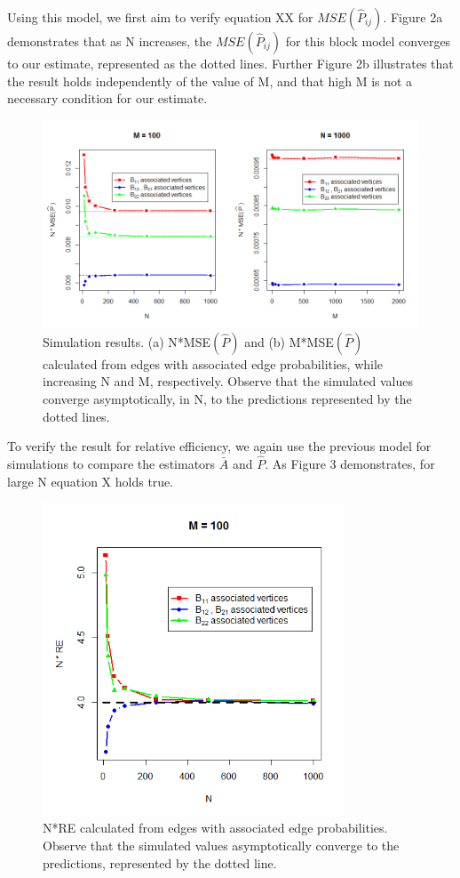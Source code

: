 Using this model, we first aim to verify equation XX for $MSE(\hat{P}_{ij})$.  Figure 2a demonstrates that as N increases, the $MSE(\hat{P}_{ij})$ for this block model converges to our estimate, represented as the dotted lines.  Further Figure 2b illustrates that the result holds independently of the value of M, and that high M is not a necessary condition for our estimate.
\begin{figure}[!htb]
	\centering
	\includegraphics[width=16cm]{MSE.PNG}
	\caption{Simulation results. (a) N*MSE$(\hat{P})$ and  (b) M*MSE$(\hat{P})$  calculated from edges with associated edge probabilities, while increasing N and M, respectively.  Observe that the simulated values converge asymptotically, in N, to the predictions represented by the dotted lines.}
	\label{fig:plot1}
\end{figure}

To verify the result for relative efficiency, we again use the previous model for simulations to compare the estimators $\bar{A}$ and $\hat{P}$.  As Figure 3 demonstrates, for large N equation X holds true. 
\begin{figure}[!htb]
	\centering
	\includegraphics[width=9cm]{RE.PNG}
	\caption{N*RE calculated from edges with associated edge probabilities.  Observe that the simulated values asymptotically converge to the predictions, represented by the dotted line.}
	\label{fig:plot1}
\end{figure}

